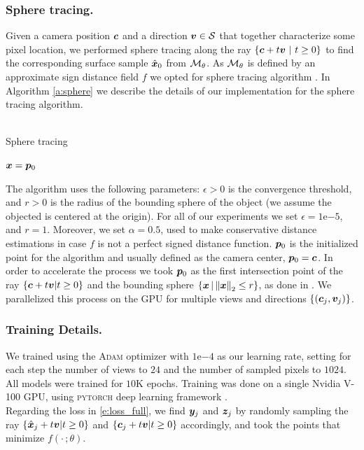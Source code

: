 \documentclass[runningheads]{llncs}
\begin{document}
\subsubsection{Sphere tracing.}
Given a camera position ${\bm{c}}$ and a direction ${\bm{v}}\in{\mathcal{S}}$ that together characterize some pixel location, 
we performed sphere tracing along the ray $\left\{{\bm{c}}+t{\bm{v}}\ \vert \ t\geq 0\right\}$ to find the corresponding surface sample ${\hat{\bm{x}}}_0$ from ${\mathcal{M}}_{\theta}$. As ${\mathcal{M}}_\theta$ is defined by an approximate sign distance field $f$ we opted for sphere tracing algorithm \cite{hart1996sphere}. In Algorithm \ref{a:sphere} we describe the details of our implementation for the sphere tracing algorithm.\\\\
\begin{algorithm}[H]\label{a:sphere}
 \caption{Sphere tracing}
\SetAlgoLined
 ${\bm{x}} = {\bm{p}}_0$\;
\end{algorithm}
\vspace{10pt}
The algorithm uses the following parameters: $\epsilon>0$ is the convergence threshold, and $r>0$ is the radius of the bounding sphere of the object (we assume the objected is centered at the origin). For all of our experiments we set $\epsilon = 1\mathrm{e}{-5}$, and $r = 1$. Moreover, we set $\alpha = 0.5$, used to make conservative distance estimations in case $f$ is not a perfect signed distance function.
%
${\bm{p}}_0$ is the initialized point for the algorithm and usually defined as the camera center, ${\bm{p}}_0 = {\bm{c}}$. In order to accelerate the process we took ${\bm{p}}_0$ as the first intersection point of the ray $\left\{{\bm{c}}+t{\bm{v}}\vert t\geq 0\right\}$ and the bounding sphere $\left\{{\bm{x}}\, \vert \left\Vert{\bm{x}}\right\Vert_2\leq r\right\}$, as done in \cite{liu2019dist}.
We parallelized this process on the GPU for multiple views and directions $\left\{({\bm{c}}_j,{\bm{v}}_j)\right\}$. 

\subsubsection{Training Details.}
We trained using the \textsc{Adam} optimizer \cite{kingma2014adam} with $1\mathrm{e}{-4}$ as our learning rate, setting for each step the number of views to $24$ and the number of sampled pixels to $1024$. All models were trained for $10$K epochs. Training was done on a single Nvidia V-100 GPU, using \textsc{pytorch} deep learning framework \cite{paszke2017automatic}.\\
Regarding the loss in \eqref{e:loss_full}, we find ${\bm{y}}_j$ and ${\bm{z}}_j$ by randomly sampling the ray $\left\{{\hat{\bm{x}}}_j+t{\bm{v}}\vert t\geq 0\right\}$ and $\left\{{\bm{c}}_j+t{\bm{v}}\vert t\geq 0\right\}$ accordingly, and took the points that minimize $f(\cdot\, ;\theta)$.
\end{document}
